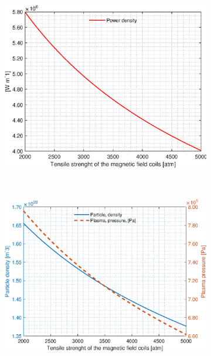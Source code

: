 \begin{figure}[H]
	\begin{subfigure}[b]{.45\textwidth}
		\includegraphics[width=\textwidth]{MatlabFigures/sigmamax/f5.eps}
	\end{subfigure}
	~
	\begin{subfigure}[b]{.45\textwidth}
		\includegraphics[width=\textwidth]{MatlabFigures/sigmamax/f6.eps}
	\end{subfigure}


\end{figure}
